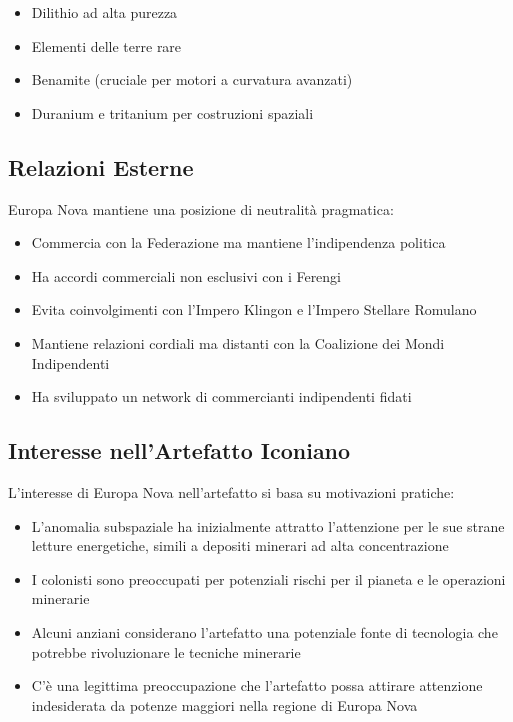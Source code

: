 \documentclass[letterpaper,twocolumn,openany,nodeprecatedcode]{dndbook}
\begin{document}
\begin{itemize}
    \item Dilithio ad alta purezza
    \item Elementi delle terre rare
    \item Benamite (cruciale per motori a curvatura avanzati)
    \item Duranium e tritanium per costruzioni spaziali
\end{itemize}
\subsection{Relazioni Esterne}
Europa Nova mantiene una posizione di neutralità pragmatica:

\begin{itemize}
    \item Commercia con la Federazione ma mantiene l'indipendenza politica
    \item Ha accordi commerciali non esclusivi con i Ferengi
    \item Evita coinvolgimenti con l'Impero Klingon e l'Impero Stellare Romulano
    \item Mantiene relazioni cordiali ma distanti con la Coalizione dei Mondi Indipendenti
    \item Ha sviluppato un network di commercianti indipendenti fidati
\end{itemize}

\subsection{Interesse nell'Artefatto Iconiano}
L'interesse di Europa Nova nell'artefatto si basa su motivazioni pratiche:

\begin{itemize}
    \item L'anomalia subspaziale ha inizialmente attratto l'attenzione per le sue strane letture energetiche, simili a depositi minerari ad alta concentrazione
    \item I colonisti sono preoccupati per potenziali rischi per il pianeta e le operazioni minerarie
    \item Alcuni anziani considerano l'artefatto una potenziale fonte di tecnologia che potrebbe rivoluzionare le tecniche minerarie
    \item C'è una legittima preoccupazione che l'artefatto possa attirare attenzione indesiderata da potenze maggiori nella regione di Europa Nova
\end{itemize}
\end{document}
